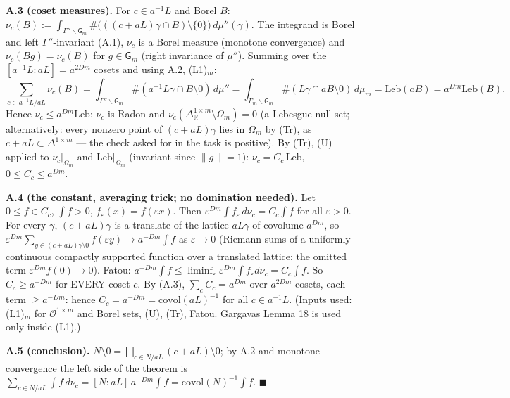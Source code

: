 \textbf{A.3 (coset measures).} For \(c\in a^{-1}L\) and Borel \(B\): \(\nu_c(B):=\int_{\Gamma''\backslash\mathsf G_m}\#\big(((c+aL)\gamma\cap B)\setminus\{0\}\big)\,d\mu''(\gamma)\). The integrand is Borel and left \(\Gamma''\)-invariant (A.1), \(\nu_c\) is a Borel measure (monotone convergence) and \(\nu_c(Bg)=\nu_c(B)\) for \(g\in\mathsf G_m\) (right invariance of \(\mu''\)). Summing over the \([a^{-1}L:aL]=a^{2Dm}\) cosets and using A.2, (L1)\(_m\):
\[\sum_{c\in a^{-1}L/aL}\nu_c(B)=\int_{\Gamma''\backslash\mathsf G_m}\#(a^{-1}L\gamma\cap B\setminus0)\,d\mu''=\int_{\Gamma_m\backslash\mathsf G_m}\#(L\gamma\cap aB\setminus0)\,d\mu_m=\mathrm{Leb}(aB)=a^{Dm}\mathrm{Leb}(B).\tag{A.3}\]
Hence \(\nu_c\le a^{Dm}\mathrm{Leb}\): \(\nu_c\) is Radon and \(\nu_c(\Delta_{\mathbb R}^{1\times m}\setminus\Omega_m)=0\) (a Lebesgue null set; alternatively: every nonzero point of \((c+aL)\gamma\) lies in \(\Omega_m\) by (Tr), as \(c+aL\subset\Delta^{1\times m}\) --- the check asked for in the task is positive). By (Tr), (U) applied to \(\nu_c|_{\Omega_m}\) and \(\mathrm{Leb}|_{\Omega_m}\) (invariant since \(\|g\|=1\)): \(\nu_c=C_c\,\mathrm{Leb}\), \(0\le C_c\le a^{Dm}\).

\textbf{A.4 (the constant, averaging trick; no domination needed).} Let \(0\le f\in C_c\), \(\int f>0\), \(f_\varepsilon(x)=f(\varepsilon x)\). Then \(\varepsilon^{Dm}\int f_\varepsilon\,d\nu_c=C_c\int f\) for all \(\varepsilon>0\). For every \(\gamma\), \((c+aL)\gamma\) is a translate of the lattice \(aL\gamma\) of covolume \(a^{Dm}\), so \(\varepsilon^{Dm}\sum_{y\in(c+aL)\gamma\setminus0}f(\varepsilon y)\to a^{-Dm}\int f\) as \(\varepsilon\to0\) (Riemann sums of a uniformly continuous compactly supported function over a translated lattice; the omitted term \(\varepsilon^{Dm}f(0)\to0\)). Fatou: \(a^{-Dm}\int f\le\liminf_\varepsilon\varepsilon^{Dm}\int f_\varepsilon d\nu_c=C_c\int f\). So \(C_c\ge a^{-Dm}\) for EVERY coset \(c\). By (A.3), \(\sum_cC_c=a^{Dm}\) over \(a^{2Dm}\) cosets, each term \(\ge a^{-Dm}\): hence \(C_c=a^{-Dm}=\mathrm{covol}(aL)^{-1}\) for all \(c\in a^{-1}L\). (Inputs used: (L1)\(_m\) for \(\mathcal O^{1\times m}\) and Borel sets, (U), (Tr), Fatou. Gargava\textquotesingle s Lemma 18 is used only inside (L1).)

\textbf{A.5 (conclusion).} \(N\setminus0=\bigsqcup_{c\in N/aL}(c+aL)\setminus0\); by A.2 and monotone convergence the left side of the theorem is \(\sum_{c\in N/aL}\int f\,d\nu_c=[N:aL]\,a^{-Dm}\int f=\mathrm{covol}(N)^{-1}\int f\). \(\blacksquare\)

